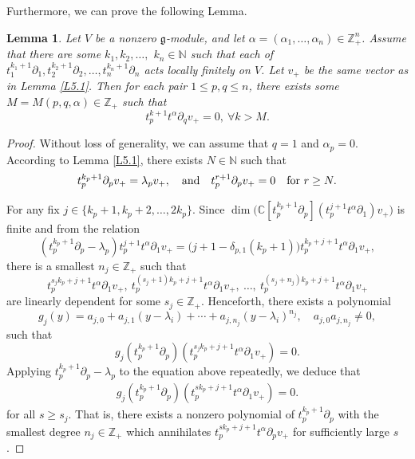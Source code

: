 \documentclass[12pt, a4paper]{amsart}
\newcommand{\fg}{\mathfrak g}
\newcommand{\N}{\mathbb N}
\newcommand{\Z}{\mathbb Z}
\theoremstyle{Theorem}
\theoremstyle{Theorem}
\newtheorem{lemma}[thm]{Lemma}
\numberwithin{equation}{section}
\begin{document}
Furthermore, we can prove the following Lemma.
\begin{lemma}\label{CL-1}
	Let $V$ be a nonzero $\fg$-module, and let $\alpha=(\alpha_1,\dots,\alpha_n)\in\mathbb{Z}_+^n$. Assume that there are  some $k_{1},k_{2},\dots,$ $k_{n}\in\N$ such that each of $t_{1}^{k_{1}+1}\partial_{1},t_{2}^{k_{2}+1}\partial_{2},\dots, t_{n}^{k_{n}+1}\partial_{n}$
	acts locally finitely on $V$. Let $v_+$ be the same vector as in Lemma \ref{L5.1}. Then for each pair $1\le p,q\le n$, there exists some $M=M(p,q,\alpha)\in \mathbb{Z}_+$ such that 
	\begin{equation*}
		t_p^{k+1}t^\alpha\partial_qv_+=0,~\forall k>M.
	\end{equation*}
\end{lemma}
\begin{proof}
Without loss of  generality, we can assume that $q=1$ and $\alpha_p=0$.
According to Lemma \ref{L5.1}, there exists $N\in\N$ such that 
\[\aligned
 t_{p}^{k_{p}+1}\partial_{p}v_+=\lambda_pv_+ ,\quad \text{and}\quad
t_{p}^{r +1}\partial_{p}v_+=0\quad \text{for} \ r \geq N.
\endaligned\]


	For any fix $j\in\{k_p+1,k_p+2,\dots,2k_p\}$. Since $\dim \big(\mathbb{C}[t_{p}^{k_p+1}\partial_{p}](t_{p}^{j+1}t^{\alpha}\partial_{1})v_+
\big) $ is finite and from the relation
	\[(t_{p}^{k_p+1}\partial_{p}-\lambda_{p})t_{p}^{j+1}t^{\alpha}\partial_{1}v_+=
	\big(j+1-\delta_{p,1}(k_p+1)\big)t_{p}^{k_p+j+1}t^{\alpha}\partial_{1}v_+,\]
	there is a smallest $n_{j}\in\Z_{+}$ such that
	\[t_{p}^{s_{j}k_p+j+1}t^{\alpha}\partial_{1}v_+,\ t_{p}^{(s_{j}+1)k_p+j+1}t^{\alpha}\partial_{1}v_+,\ \dots,\ t_{p}^{(s_{j}+n_{j})k_p+j+1}t^{\alpha}\partial_{1}v_+\]
	are linearly dependent for some $s_{j}\in\Z_{+}$. Henceforth, there exists a polynomial
	\[g_{j}(y)=a_{j,0}+a_{j,1}(y-\lambda_{i})+\cdots+a_{j,n_{j}}(y-\lambda_{i})^{n_{j}},\quad a_{j,0}a_{j,n_{j}}\neq0,\]
	such that
	\[g_{j}(t_{p}^{k_p+1}\partial_{p})(t_{p}^{s_{j}k_p+j+1}t^{\alpha}\partial_{1}v_+)=0.\]
	Applying $t_{p}^{k_p+1}\partial_{p}-\lambda_{p}$ to the equation above repeatedly, we deduce that
	\begin{align}\label{the-first-equation-1}
		g_{j}(t_{p}^{k_p+1}\partial_{p})(t_{p}^{sk_p+j+1}t^{\alpha}\partial_{1}v_+)=0.
	\end{align}
	for all $s\geq s_{j}$. That is, there exists a nonzero polynomial of $t_{p}^{k_p+1}\partial_{p}$ with the smallest degree $n_{j}\in\Z_{+}$
	which annihilates $t_{p}^{sk_p+j+1}t^{\alpha}\partial_{p}v_+$ for sufficiently large $s$.
	

\end{proof}
\end{document}
